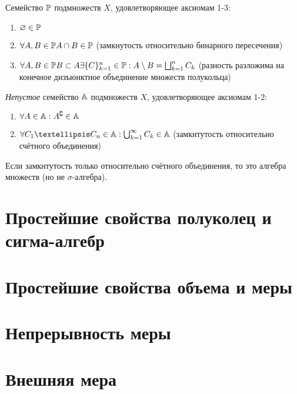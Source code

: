 \documentclass[12pt, a4paper, oneside]{memoir}
\begin{document}
\begin{definition}

    Семейство ${\mathbb{P}}$ подмножеств $X$, удовлетворяющее аксиомам 1-3:

    \begin{enumerate}
        \item $\varnothing \in {\mathbb{P}}$
        \item $\forall A, B \in {\mathbb{P}} A \cap B \in {\mathbb{P}}$ (замкнутость относительно бинарного пересечения)
        \item $\forall A, B \in {\mathbb{P}} B \subset A \exists \{ C \}_{k = 1}^n \in {\mathbb{P}}: A \setminus B = \bigsqcup_{k = 1}^n C_k$
        (разность разложима на конечное дизъюнктное объединение множеств полукольца)
    \end{enumerate}
\end{definition}

\begin{definition}

    \textit{Непустое} семейство ${\mathbb{A}}$ подмножеств $X$, удовлетворяющее аксиомам 1-2:

    \begin{enumerate}
        \item $\forall A \in {\mathbb{A}}: A^{\complement} \in {\mathbb{A}}$
        \item $\forall C_1 … C_n \in \sA: \bigcup_{k = 1}^\infty C_k \in \sA$ (замкнтутость относительно счётного объединения)
    \end{enumerate}
\end{definition}

\begin{remark}
    Если замкнтутость только относительно счётного объединения, то это алгебра множеств (но не $\sigma$-алгебра).
\end{remark}


\section{Простейшие свойства полуколец и сигма-алгебр}
\section{Простейшие свойства объема и меры}
\section{Непрерывность меры}
\section{Внешняя мера}
\end{document}
